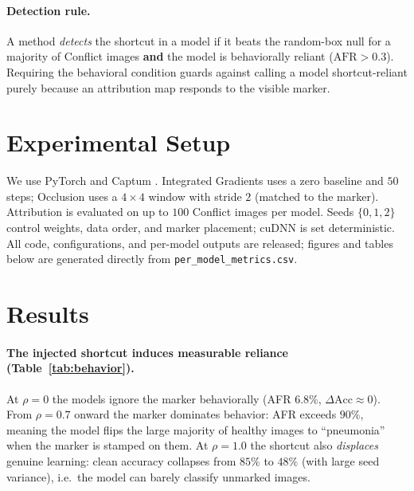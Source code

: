 \documentclass[11pt]{article}
\begin{document}
\paragraph{Detection rule.} A method \emph{detects} the shortcut in a model if it beats the random-box
null for a majority of Conflict images \textbf{and} the model is behaviorally reliant
($\mathrm{AFR}>0.3$). Requiring the behavioral condition guards against calling a model
shortcut-reliant purely because an attribution map responds to the visible marker.

\section{Experimental Setup}
\label{sec:setup}
We use PyTorch \citep{paszke2019pytorch} and Captum \citep{kokhlikyan2020captum}. Integrated
Gradients uses a zero baseline and $50$ steps; Occlusion uses a $4\times4$ window with stride $2$
(matched to the marker). Attribution is evaluated on up to $100$ Conflict images per model. Seeds
$\{0,1,2\}$ control weights, data order, and marker placement; cuDNN is set deterministic. All code,
configurations, and per-model outputs are released; figures and tables below are generated directly
from \texttt{per\_model\_metrics.csv}.

\section{Results}
\label{sec:results}

\paragraph{The injected shortcut induces measurable reliance (Table~\ref{tab:behavior}).}
At $\rho=0$ the models ignore the marker behaviorally (AFR $6.8\%$, $\Delta\mathrm{Acc}\approx 0$).
From $\rho=0.7$ onward the marker dominates behavior: AFR exceeds $90\%$, meaning the model flips
the large majority of healthy images to ``pneumonia'' when the marker is stamped on them. At
$\rho=1.0$ the shortcut also \emph{displaces} genuine learning: clean accuracy collapses from
$85\%$ to $48\%$ (with large seed variance), i.e.\ the model can barely classify unmarked images.
\end{document}
